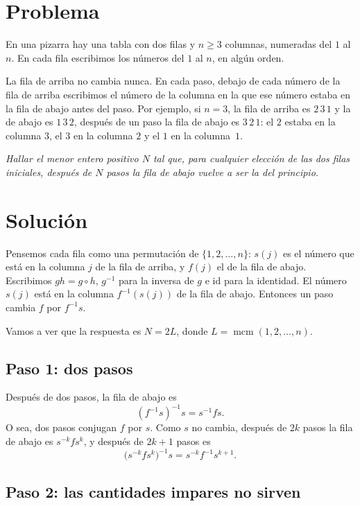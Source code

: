 \documentclass[11pt]{amsproc}
\newcommand{\id}{\mathrm{id}}
\newcommand{\mcm}{\operatorname{mcm}}
\begin{document}
\section*{Problema}

En una pizarra hay una tabla con dos filas y $n\ge 3$ columnas, numeradas
del $1$ al $n$. En cada fila escribimos los números del $1$ al $n$, en algún
orden.

La fila de arriba no cambia nunca. En cada paso, debajo de cada número de la
fila de arriba escribimos el número de la columna en la que ese número estaba
en la fila de abajo antes del paso. Por ejemplo, si $n=3$, la fila de arriba
es $2\,3\,1$ y la de abajo es $1\,3\,2$, después de un paso la fila de abajo
es $3\,2\,1$: el $2$ estaba en la columna $3$, el $3$ en la columna $2$ y el
$1$ en la columna~$1$.

{\itshape Hallar el menor entero positivo $N$ tal que, para cualquier
elección de las dos filas iniciales, después de $N$ pasos la fila de abajo
vuelve a ser la del principio.}

\section*{Solución}

Pensemos cada fila como una permutación de $\{1,2,\dots,n\}$: $s(j)$ es el
número que está en la columna $j$ de la fila de arriba, y $f(j)$ el de la
fila de abajo. Escribimos $gh=g\circ h$, $g^{-1}$ para la inversa de $g$ e
$\id$ para la identidad. El número $s(j)$ está en la columna $f^{-1}(s(j))$
de la fila de abajo. Entonces un paso cambia $f$ por $f^{-1}s$.

Vamos a ver que la respuesta es $N=2L$, donde $L=\mcm(1,2,\dots,n)$.

\subsection*{Paso 1: dos pasos}

Después de dos pasos, la fila de abajo es
\[
  (f^{-1}s)^{-1}s=s^{-1}fs .
\]
O sea, dos pasos conjugan $f$ por $s$. Como $s$ no cambia, después de $2k$
pasos la fila de abajo es $s^{-k}fs^k$, y después de $2k+1$ pasos es
\[
  \bigl(s^{-k}fs^k\bigr)^{-1}s=s^{-k}f^{-1}s^{k+1}.
\]

\subsection*{Paso 2: las cantidades impares no sirven}
\end{document}

